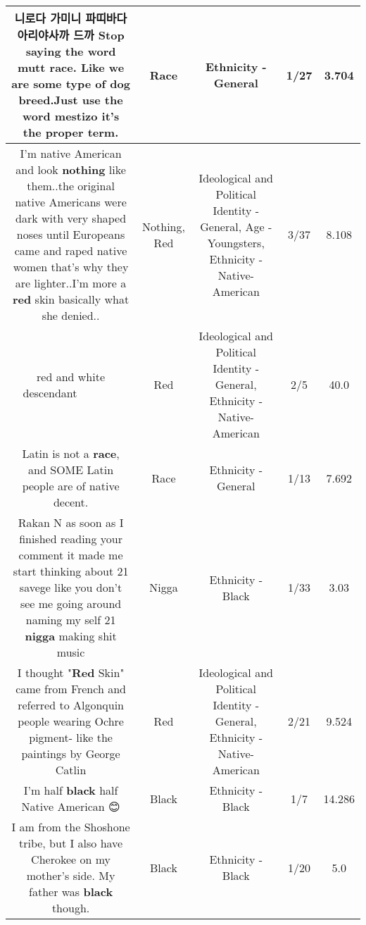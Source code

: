 \documentclass[11pt]{article}
\newlength\mylength
\begin{document}
\begin{center}
\begin{longtable}{|C{.65\mylength}|C{.30\mylength}|C{.12\mylength}|C{.12\mylength}|C{.12\mylength}|}
  \small 니로다 가미니 파띠바다 아리야사까 드까 Stop saying the word mutt \textbf{race}. Like we are some type of dog breed.Just use the word mestizo it's the proper term.\normalsize   & Race & Ethnicity - General & 1/27 & 3.704 \\  \hline
  \small I'm native American and look \textbf{nothing} like them..the original native Americans were dark with very shaped noses until Europeans  came and raped native women that's why they are lighter..I'm more a \textbf{r\textbf{ed}} skin basically what she denied..\normalsize   & Nothing, Red &  Ideological and Political Identity - General, Age - Youngsters, Ethnicity - Native-American & 3/37 & 8.108 \\  \hline
  \small red and white descendant 👏🏽👏🏽👏🏽🙌🏽🙌🏽🙌🏽\normalsize   & Red &  Ideological and Political Identity - General, Ethnicity - Native-American & 2/5 & 40.0 \\  \hline
  \small Latin is not a \textbf{race}, and SOME Latin people are of native decent.\normalsize   & Race & Ethnicity - General & 1/13 & 7.692 \\  \hline
  \small Rakan N as soon as I finished reading your comment it made me start thinking about 21 savege like you don't see me going around naming my self 21 \textbf{nigga} making shit music\normalsize   & Nigga & Ethnicity - Black & 1/33 & 3.03 \\  \hline
  \small I thought "\textbf{R\textbf{ed}} Skin" came from French and referred to Algonquin people wearing Ochre pigment- like the paintings by George Catlin\normalsize   & Red &  Ideological and Political Identity - General, Ethnicity - Native-American & 2/21 & 9.524 \\  \hline
  \small I'm half \textbf{black} half Native American 😊\normalsize   & Black & Ethnicity - Black & 1/7 & 14.286 \\  \hline
  \small I am from the Shoshone tribe, but I also have Cherokee on my mother's side.  My father was \textbf{black} though.\normalsize   & Black & Ethnicity - Black & 1/20 & 5.0 \\  \hline

\end{longtable}
\end{center}
\end{document}
